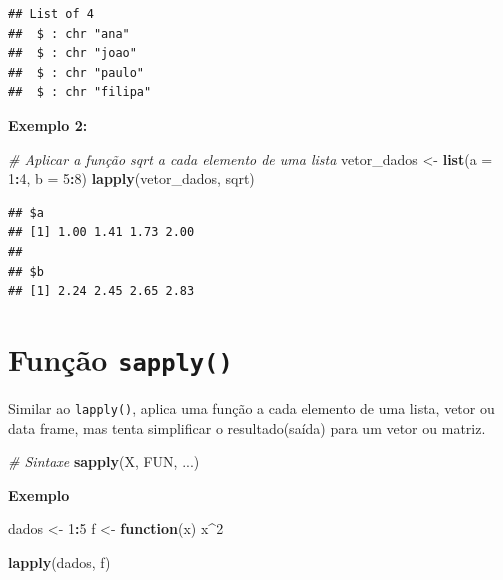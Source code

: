 \documentclass[
]{book}
\newenvironment{Shaded}{\begin{snugshade}}{\end{snugshade}}
\newcommand{\AttributeTok}[1]{\textcolor[rgb]{0.13,0.29,0.53}{#1}}
\newcommand{\CommentTok}[1]{\textcolor[rgb]{0.56,0.35,0.01}{\textit{#1}}}
\newcommand{\ControlFlowTok}[1]{\textcolor[rgb]{0.13,0.29,0.53}{\textbf{#1}}}
\newcommand{\DecValTok}[1]{\textcolor[rgb]{0.00,0.00,0.81}{#1}}
\newcommand{\FunctionTok}[1]{\textcolor[rgb]{0.13,0.29,0.53}{\textbf{#1}}}
\newcommand{\NormalTok}[1]{#1}
\newcommand{\OtherTok}[1]{\textcolor[rgb]{0.56,0.35,0.01}{#1}}
\newcommand{\SpecialCharTok}[1]{\textcolor[rgb]{0.81,0.36,0.00}{\textbf{#1}}}
\theoremstyle{definition}
\theoremstyle{definition}
\theoremstyle{definition}
\theoremstyle{definition}
\theoremstyle{remark}
\begin{document}
\begin{verbatim}
## List of 4
##  $ : chr "ana"
##  $ : chr "joao"
##  $ : chr "paulo"
##  $ : chr "filipa"
\end{verbatim}

\textbf{Exemplo 2:}

\begin{Shaded}
\begin{Highlighting}[]
\CommentTok{\# Aplicar a função sqrt a cada elemento de uma lista}
\NormalTok{vetor\_dados }\OtherTok{\textless{}{-}} \FunctionTok{list}\NormalTok{(}\AttributeTok{a =} \DecValTok{1}\SpecialCharTok{:}\DecValTok{4}\NormalTok{, }\AttributeTok{b =} \DecValTok{5}\SpecialCharTok{:}\DecValTok{8}\NormalTok{)}
\FunctionTok{lapply}\NormalTok{(vetor\_dados, sqrt)}
\end{Highlighting}
\end{Shaded}

\begin{verbatim}
## $a
## [1] 1.00 1.41 1.73 2.00
## 
## $b
## [1] 2.24 2.45 2.65 2.83
\end{verbatim}

\section{\texorpdfstring{Função \texttt{sapply()}}{Função sapply()}}\label{funuxe7uxe3o-sapply}

Similar ao \texttt{lapply()}, aplica uma função a cada elemento de uma lista, vetor ou data frame, mas tenta simplificar o resultado(saída) para um vetor ou matriz.

\begin{Shaded}
\begin{Highlighting}[]
\CommentTok{\# Sintaxe}
\FunctionTok{sapply}\NormalTok{(X, FUN, ...)}
\end{Highlighting}
\end{Shaded}

\textbf{Exemplo}

\begin{Shaded}
\begin{Highlighting}[]
\NormalTok{dados }\OtherTok{\textless{}{-}} \DecValTok{1}\SpecialCharTok{:}\DecValTok{5}
\NormalTok{f }\OtherTok{\textless{}{-}} \ControlFlowTok{function}\NormalTok{(x) x}\SpecialCharTok{\^{}}\DecValTok{2}

\FunctionTok{lapply}\NormalTok{(dados, f)}
\end{Highlighting}
\end{Shaded}
\end{document}
